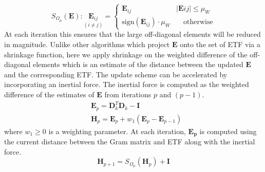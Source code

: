 %
\begin{equation}
    \label{eq:shrinkage_fn}
    S_{\Omega_{\mu}}(\bm{E}): \underset{(i\neq j)}{\bm{E}_{ij}} =
    \begin{cases}
      \bm{E}_{ij} & \lvert \bm{E}{ij}\rvert \leq \mu_{W} \\
      \text{sign}(\bm{E}_{ij})\cdot\mu_{W} & \quad \text{otherwise}
    \end{cases}
\end{equation}
%
At each iteration this ensures that the large off-diagonal elements will be reduced in magnitude. Unlike other algorithms which project $\bm{E}$ onto the set of ETF via a shrinkage function, here we apply shrinkage on the weighted difference of the off-diagonal elements which is an estimate of the distance between the updated $\bm{E}$ and the corresponding ETF. The update scheme can be accelerated by incorporating an inertial force. The inertial force is computed as the weighted difference of the estimates of $\bm{E}$ from iterations $p$ and $(p-1)$.
%
\begin{align}
    \label{eq:EH_inertial_force}
    & \bm{E}_{p} = \bm{D}_{k}^{T}\bm{D}_{k} - \bm{I}\nonumber\\ 
    & \bm{H}_{p} = \bm{E}_{p} + w_{1}(\bm{E}_{p} - \bm{E}_{p-1})
\end{align} 
%
where $w_{1} \geq 0$ is a weighting parameter. At each iteration, $\bm{E_{p}}$ is computed using the current distance between the Gram matrix and ETF along with the inertial force. 
%
\begin{equation}
    \label{eq:H_update}
    \bm{H}_{p+1} = S_{\Omega_{\mu}}(\bm{H}_{p}) + \bm{I} 
\end{equation}
%
%
